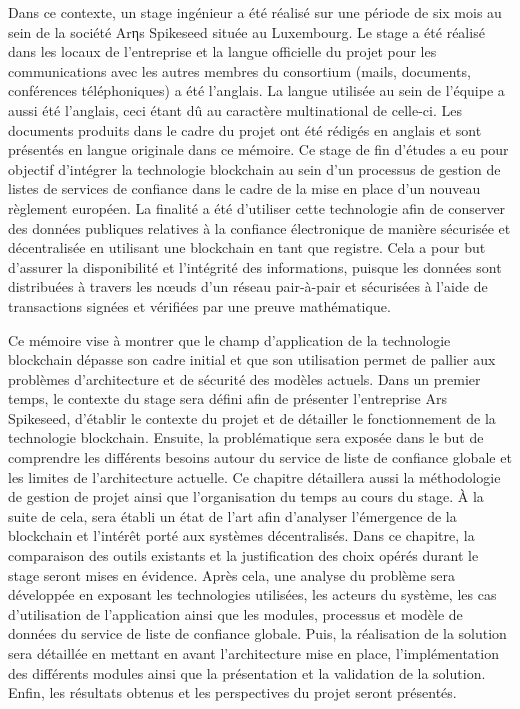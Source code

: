 \documentclass{tnreport}
\begin{document}
Dans ce contexte, un stage ingénieur a été réalisé sur une période de six mois au sein de la société Arηs Spikeseed située au Luxembourg. 
Le stage a été réalisé dans les locaux de l'entreprise et la langue officielle du projet pour les communications avec les autres membres du consortium (mails, documents, conférences téléphoniques) a été l’anglais. La langue utilisée au sein de l'équipe a aussi été l'anglais, ceci étant dû au caractère multinational de celle-ci. Les documents produits dans le cadre du projet ont été rédigés en anglais et sont présentés en langue originale dans ce mémoire.
Ce stage de fin d'études a eu pour objectif d'intégrer la technologie blockchain au sein d'un processus de gestion de listes de services de confiance dans le cadre de la mise en place d'un nouveau règlement européen. 
La finalité a été d'utiliser cette technologie afin de conserver des données publiques relatives à la confiance électronique de manière sécurisée et décentralisée en utilisant une blockchain en tant que registre.
Cela a pour but d'assurer la disponibilité et l'intégrité des informations, puisque les données sont distribuées à travers les nœuds d'un réseau pair-à-pair et sécurisées à l'aide de transactions signées et vérifiées par une preuve mathématique. 


Ce mémoire vise à montrer que le champ d'application de la technologie blockchain dépasse son cadre initial et que son utilisation permet de pallier aux problèmes d'architecture et de sécurité des modèles actuels. 
Dans un premier temps, le contexte du stage sera défini afin de présenter l'entreprise Ar{\texteta}s Spikeseed, d'établir le contexte du projet et de détailler le fonctionnement de la technologie blockchain.
Ensuite, la problématique sera exposée dans le but de comprendre les différents besoins autour du service de liste de confiance globale et les limites de l'architecture actuelle. Ce chapitre détaillera aussi la méthodologie de gestion de projet ainsi que l'organisation du temps au cours du stage.
À la suite de cela, sera établi un état de l'art afin d'analyser l'émergence de la blockchain et l'intérêt porté aux systèmes décentralisés. Dans ce chapitre, la comparaison des outils existants et la justification des choix opérés durant le stage seront mises en évidence. 
Après cela, une analyse du problème sera développée en exposant les technologies utilisées, les acteurs du système, les cas d'utilisation de l'application ainsi que les modules, processus et modèle de données du service de liste de confiance globale.
Puis, la réalisation de la solution sera détaillée en mettant en avant l'architecture mise en place, l'implémentation des différents modules ainsi que la présentation et la validation de la solution.
Enfin, les résultats obtenus et les perspectives du projet seront présentés.
\end{document}
